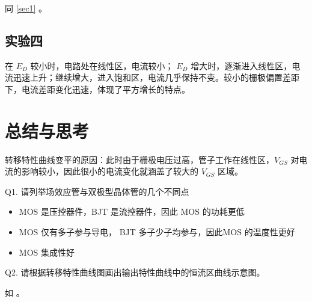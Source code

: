 \documentclass[lang=cn,11pt,a4paper,cite=authoryear]{elegantpaper}
\begin{document}
同 \ref{sec1} 。

\subsection{实验四}

在 \(E_D\) 较小时，电路处在线性区，电流较小； \(E_D\) 增大时，逐渐进入线性区，电流迅速上升；继续增大，进入饱和区，电流几乎保持不变。较小的栅极偏置差距下，电流差距变化迅速，体现了平方增长的特点。

\section{总结与思考}

转移特性曲线变平的原因：此时由于栅极电压过高，管子工作在线性区，\(V_{GS}\) 对电流的影响较小，因此很小的电流变化就涵盖了较大的 \(V_{GS}\) 区域。

Q1. 请列举场效应管与双极型晶体管的几个不同点

\begin{itemize}
    \item MOS 是压控器件，BJT 是流控器件，因此 MOS 的功耗更低
    \item MOS 仅有多子参与导电， BJT 多子少子均参与，因此MOS 的温度性更好
    \item MOS 集成性好
\end{itemize}

Q2. 请根据转移特性曲线图画出输出特性曲线中的恒流区曲线示意图。

如  。




\end{document}
